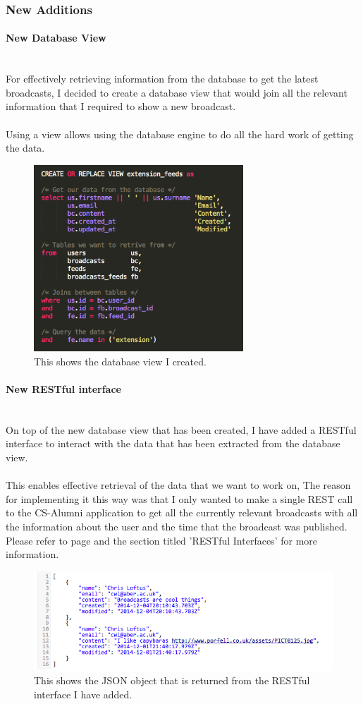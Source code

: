 \documentclass{article}
\newcommand{\myparagraph}[1]{\paragraph{#1}\mbox{}\\}
\begin{document}
\subsubsection{New Additions}

\myparagraph{New Database View}
For effectively retrieving information from the database to get the latest broadcasts, I decided to create a database view that would join all the relevant information that I required to show a new broadcast.\\
\\
Using a view allows using the database engine to do all the hard work of getting the data.

\begin{figure}[H]
\centering
\includegraphics[width=0.7\textwidth]{sqlview}
\caption{This shows the database view I created.}
\end{figure}

\myparagraph{New RESTful interface}
On top of the new database view that has been created, I have added a RESTful interface to interact with the data that has been extracted from the database view. \\
\\
This enables effective retrieval of the data that we want to work on, The reason for implementing it this way was that I only wanted to make a single REST call to the CS-Alumni application to get all the currently relevant broadcasts with all the information about the user and the time that the broadcast was published.
\\ 
Please refer to page \pageref{sec:technology} and the section titled 'RESTful Interfaces' for more information.

\begin{figure}[H]
\centering
\includegraphics[width=\textwidth]{broadcastrest}
\caption{This shows the JSON object that is returned from the RESTful interface I have added.}
\end{figure}
\end{document}
